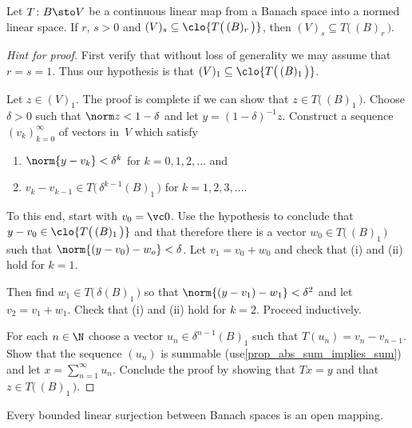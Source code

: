 \begin{prop}\label{prop_for_OMT} Let $T\colon B \sto V$ be a continuous linear map from a Banach space into a normed linear space.
If $r$, $s > 0$ and $(V)_s \subseteq \clo{T\bigl(\,(B)_r\,\bigr)}$, then $(V)_s \subseteq T\bigl(\,(B)_r\,\bigr)$.
\end{prop}

\begin{proof}[\emph{Hint for proof}] First verify that without loss of generality we may assume that $r = s = 1$.  Thus
our hypothesis is that $(V)_1 \subseteq \clo{T\bigl(\,(B)_1\,\bigr)}$.

Let $z \in (V)_1$.  The proof is complete if we can show that $z \in T\bigl(\,(B)_1\,\bigr)$.  Choose $\delta > 0$ such
that $\norm z < 1 - \delta$ and let $y = (1 - \delta)^{-1}z$.  Construct a sequence $(v_k)_{k=0}^\infty$ of vectors in~$V$
which satisfy
   \begin{enumerate}
     \item[(i)] $\norm{y - v_k} < \delta^k$ for $k = 0,1,2,\dots$ and
     \item[(ii)] $v_k - v_{k-1} \in T\bigl(\,\delta^{k-1}(B)_1\,\bigr)$ for $k = 1,2,3,\dots$.
   \end{enumerate}
To this end, start with $v_0 = \vc 0$. Use the hypothesis to conclude that $y - v_0 \in \clo{T\bigl(\,(B)_1\,\bigr)}$ and
that therefore there is a vector $w_0 \in T\bigl(\,(B)_1\,\bigr)$ such that $\norm{(y - v_0) - w_o} < \delta$.  Let
$v_1 = v_0 + w_0$ and check that (i) and (ii) hold for $k = 1$.

Then find $w_1 \in T\bigl(\,\delta (B)_1\,\bigr)$ so that $\norm{(y - v_1) - w_1} < \delta^2$ and let $v_2 = v_1 + w_1$.
Check that (i) and (ii) hold for $k= 2$.  Proceed inductively.

For each $n \in \N$ choose a vector $u_n \in \delta^{n-1}(B)_1$ such that $T(u_n) = v_n - v_{n-1}$. Show that the sequence
$(u_n)$ is summable (use\ref{prop_abs_sum_implies_sum}) and let $x = \sum_{n=1}^\infty u_n$.  Conclude the proof by showing
that $Tx = y$  and that $z \in T\bigl(\,(B)_1\,\bigr)$.   \ns
\end{proof}

\begin{thm}\label{C069414} Every bounded linear surjection between
Banach spaces is an open mapping.
\end{thm}

